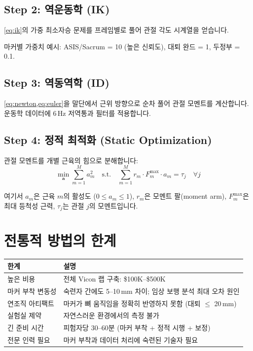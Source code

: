 \documentclass[11pt, a4paper]{report}
\begin{document}
\subsection{Step 2: 역운동학 (IK)}

\cref{eq:ik}의 가중 최소자승 문제를 프레임별로 풀어 관절 각도 시계열을 얻습니다.

마커별 가중치 예시: ASIS/Sacrum = 10 (높은 신뢰도), 대퇴 완드 = 1, 두정부 = 0.1.

\subsection{Step 3: 역동역학 (ID)}

\cref{eq:newton,eq:euler}을 말단에서 근위 방향으로 순차 풀어 관절 모멘트를 계산합니다. 운동학 데이터에 6\,Hz 저역통과 필터를 적용합니다.

\subsection{Step 4: 정적 최적화 (Static Optimization)}

관절 모멘트를 개별 근육의 힘으로 분해합니다:
\begin{equation}
\min_{\mathbf{a}} \sum_{m=1}^{M} a_m^2 \quad \text{s.t.} \quad \sum_{m=1}^{M} r_m \cdot F_m^{\max} \cdot a_m = \tau_j \quad \forall j
\label{eq:static_opt}
\end{equation}

여기서 $a_m$은 근육 $m$의 활성도 ($0 \leq a_m \leq 1$), $r_m$은 모멘트 팔(moment arm), $F_m^{\max}$은 최대 등척성 근력, $\tau_j$는 관절 $j$의 모멘트입니다.


\section{전통적 방법의 한계}

\begin{center}
\renewcommand{\arraystretch}{1.3}
\begin{tabular}{p{4cm}p{8cm}}
\toprule
\textbf{한계} & \textbf{설명} \\
\midrule
높은 비용 & 전체 Vicon 랩 구축: \$100K--\$500K \\
마커 부착 변동성 & 숙련자 간에도 5--10\,mm 차이; 임상 보행 분석 최대 오차 원인 \\
연조직 아티팩트 & 마커가 뼈 움직임을 정확히 반영하지 못함 (대퇴 $\leq$ 20\,mm) \\
실험실 제약 & 자연스러운 환경에서의 측정 불가 \\
긴 준비 시간 & 피험자당 30--60분 (마커 부착 + 정적 시행 + 보정) \\
전문 인력 필요 & 마커 부착과 데이터 처리에 숙련된 기술자 필요 \\
\bottomrule
\end{tabular}
\end{center}
\end{document}
